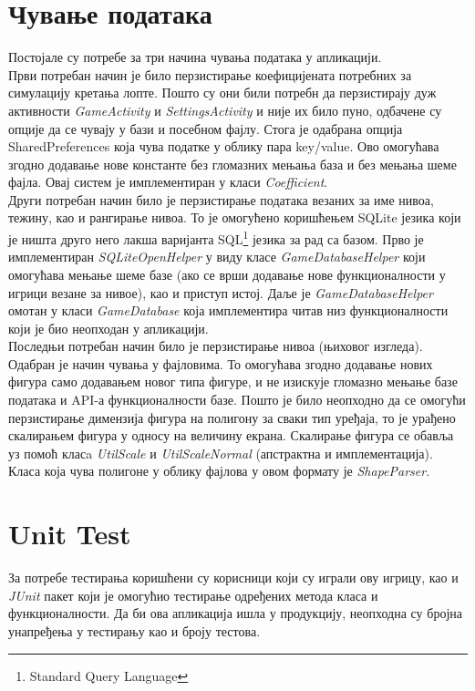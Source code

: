 \section{Чување података}
Постојале су потребе за три начина чувања података у апликацији. 
\\ \indent 
Први потребан начин је било перзистирање коефицијената потребних за симулацију кретања лопте. Пошто су они били потребн да перзистирају дуж активности \emph{GameActivity} и \emph{SettingsActivity} и није их било пуно, одбачене су опције да се чувају у бази и посебном фајлу. Стога је одабрана опција SharedPreferences која чува податке у облику пара key/value. Ово омогућава згодно додавање нове константе без гломазних мењања база и без мењања шеме фајла. Овај систем је имплементиран у класи \emph{Coefficient}.
\\ \indent 
Други потребан начин било је перзистирање података везаних за име нивоа, тежину, као и рангирање нивоа. То је омогућено коришћењем SQLite језика који је ништа друго него лакша варијанта SQL\footnote{Standard Query Language} језика за рад са базом. Прво је имплементиран \emph{SQLiteOpenHelper} у виду класе \emph{GameDatabaseHelper} који омогућава мењање шеме базе (ако се врши додавање нове функционалности у игрици везане за нивое), као и приступ истој. Даље је \emph{GameDatabaseHelper} омотан у класи \emph{GameDatabase} која имплементира читав низ функционалности који је био неопходан у апликацији. 
\\ \indent 
Последњи потребан начин било је перзистирање нивоа (њиховог изгледа). Одабран је начин чувања у фајловима. То омогућава згодно додавање нових фигура само додавањем новог типа фигуре, и не изискује гломазно мењање базе података и API-а функционалности базе. Пошто је било неопходно да се омогући перзистирање димензија фигура на полигону за сваки тип уређаја, то је урађено скалирањем фигура у односу на величину екрана. Скалирање фигура се обавља уз помоћ класa \emph{UtilScale} и \emph{UtilScaleNormal} (апстрактна и имплементација). Класа која чува полигоне у облику фајлова у овом формату је \emph{ShapeParser}. 

\section{Unit Test}
За потребе тестирања коришћени су корисници који су играли ову игрицу, као и \emph{JUnit} пакет који је омогућио тестирање одређених метода класа и функционалности. Да би ова апликација ишла у продукцију, неопходна су бројна унапређења у тестирању као и броју тестова.